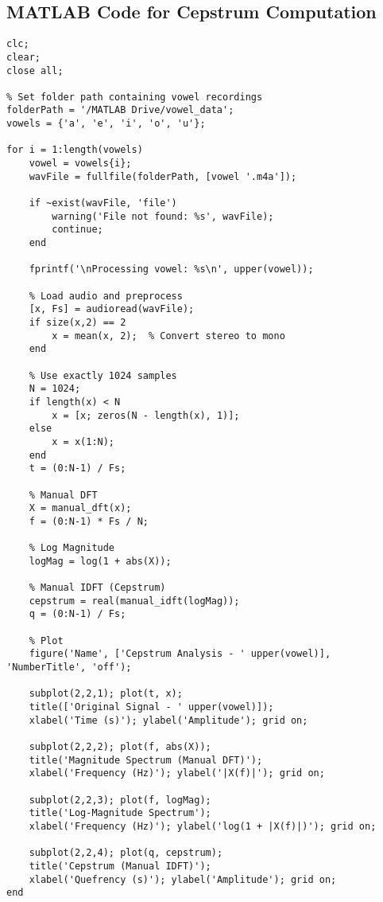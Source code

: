 \documentclass[a4paper,12pt]{article}
\begin{document}
\subsection{MATLAB Code for Cepstrum Computation}
\begin{verbatim}
clc;
clear;
close all;

% Set folder path containing vowel recordings
folderPath = '/MATLAB Drive/vowel_data';
vowels = {'a', 'e', 'i', 'o', 'u'};

for i = 1:length(vowels)
    vowel = vowels{i};
    wavFile = fullfile(folderPath, [vowel '.m4a']);
    
    if ~exist(wavFile, 'file')
        warning('File not found: %s', wavFile);
        continue;
    end

    fprintf('\nProcessing vowel: %s\n', upper(vowel));
    
    % Load audio and preprocess
    [x, Fs] = audioread(wavFile);
    if size(x,2) == 2
        x = mean(x, 2);  % Convert stereo to mono
    end
    
    % Use exactly 1024 samples
    N = 1024;
    if length(x) < N
        x = [x; zeros(N - length(x), 1)];
    else
        x = x(1:N);
    end
    t = (0:N-1) / Fs;
    
    % Manual DFT
    X = manual_dft(x);
    f = (0:N-1) * Fs / N;
    
    % Log Magnitude
    logMag = log(1 + abs(X));
    
    % Manual IDFT (Cepstrum)
    cepstrum = real(manual_idft(logMag));
    q = (0:N-1) / Fs;
    
    % Plot
    figure('Name', ['Cepstrum Analysis - ' upper(vowel)], 'NumberTitle', 'off');
    
    subplot(2,2,1); plot(t, x);
    title(['Original Signal - ' upper(vowel)]);
    xlabel('Time (s)'); ylabel('Amplitude'); grid on;
    
    subplot(2,2,2); plot(f, abs(X));
    title('Magnitude Spectrum (Manual DFT)');
    xlabel('Frequency (Hz)'); ylabel('|X(f)|'); grid on;
    
    subplot(2,2,3); plot(f, logMag);
    title('Log-Magnitude Spectrum');
    xlabel('Frequency (Hz)'); ylabel('log(1 + |X(f)|)'); grid on;
    
    subplot(2,2,4); plot(q, cepstrum);
    title('Cepstrum (Manual IDFT)');
    xlabel('Quefrency (s)'); ylabel('Amplitude'); grid on;
end
\end{verbatim}
\end{document}
